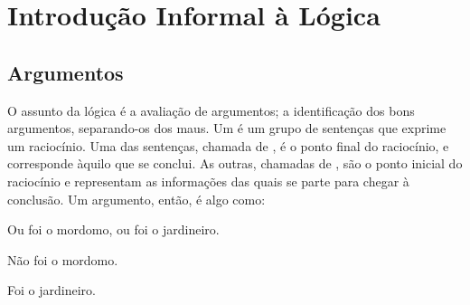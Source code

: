 \part{Introdução Informal à Lógica}
\label{ch.intro}


\chapter{Argumentos}
\label{s:Arguments}




O assunto da lógica é a avaliação de argumentos; a identificação dos bons argumentos, separando-os dos maus.
Um  é um grupo de sentenças que exprime um raciocínio.
Uma das sentenças, chamada de , é o ponto final do raciocínio, e corresponde àquilo que se conclui.
As outras, chamadas de , são o ponto inicial do raciocínio e representam as informações das quais se parte para chegar à conclusão. 
Um argumento, então, é algo como:

	\begin{earg}
		\item[] Ou foi o mordomo, ou foi o jardineiro.
		\item[] Não foi o mordomo.
		\item[\therefore] Foi o jardineiro.
		\label{argButlerGardner}
	\end{earg}
	

